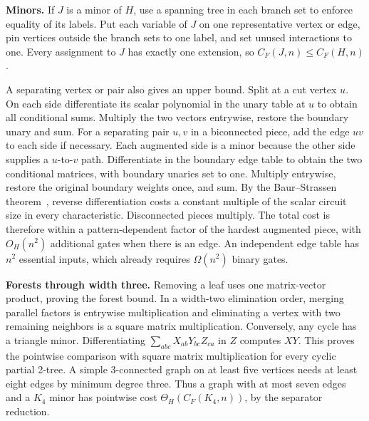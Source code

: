 \documentclass[11pt,letterpaper]{article}
\begin{document}
\textbf{Minors.} If \(J\) is a minor of \(H\), use a spanning tree in each branch set to enforce equality of its labels. Put each variable of \(J\) on one representative vertex or edge, pin vertices outside the branch sets to one label, and set unused interactions to one. Every assignment to \(J\) has exactly one extension, so \(C_F(J,n)\le C_F(H,n)\).

A separating vertex or pair also gives an upper bound. Split at a cut vertex \(u\). On each side differentiate its scalar polynomial in the unary table at \(u\) to obtain all conditional sums. Multiply the two vectors entrywise, restore the boundary unary and sum. For a separating pair \(u,v\) in a biconnected piece, add the edge \(uv\) to each side if necessary. Each augmented side is a minor because the other side supplies a \(u\)-to-\(v\) path. Differentiate in the boundary edge table to obtain the two conditional matrices, with boundary unaries set to one. Multiply entrywise, restore the original boundary weights once, and sum. By the Baur--Strassen theorem~\cite{baur-strassen}, reverse differentiation costs a constant multiple of the scalar circuit size in every characteristic. Disconnected pieces multiply. The total cost is therefore within a pattern-dependent factor of the hardest augmented piece, with \(O_H(n^2)\) additional gates when there is an edge. An independent edge table has \(n^2\) essential inputs, which already requires \(\Omega(n^2)\) binary gates.

\textbf{Forests through width three.} Removing a leaf uses one matrix-vector product, proving the forest bound. In a width-two elimination order, merging parallel factors is entrywise multiplication and eliminating a vertex with two remaining neighbors is a square matrix multiplication. Conversely, any cycle has a triangle minor. Differentiating \(\sum_{abc}X_{ab}Y_{bc}Z_{ca}\) in \(Z\) computes \(XY\). This proves the pointwise comparison with square matrix multiplication for every cyclic partial 2-tree. A simple 3-connected graph on at least five vertices needs at least eight edges by minimum degree three. Thus a graph with at most seven edges and a \(K_4\) minor has pointwise cost \(\Theta_H(C_F(K_4,n))\), by the separator reduction.
\end{document}
